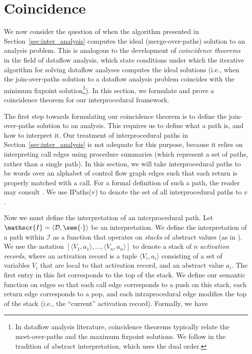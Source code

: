 \section{Coincidence}

 We now consider the question of when the algorithm presented in
 Section~\ref{sec:inter_analysis} computes the ideal (merge-over-paths)
 solution to an analysis problem.  This is analogous to the development of
 \emph{coincidence theorems} \cite{Kam1977,Sharir1981,Knoop1992b,Lal2005} in
 the field of dataflow analysis, which state conditions under which the
 iterative algorithm for solving dataflow analyses computes the ideal
 solutions (i.e., when the join-over-paths solution to a dataflow analysis
 problem coincides with the minimum fixpoint solution\footnote{In dataflow
   analysis literature, coincidence theorems typically relate the
   meet-over-paths and the maximum fixpoint solutions.  We follow in the
   tradition of abstract interpretation, which uses the dual order.}).  In this
 section, we formulate and prove a coincidence theorem for our interprocedural
 framework.

 The first step towards formulating our coincidence theorem is to define the
 join-over-paths solution to an analysis.  This requires us to define what a
 path is, and how to interpret it.  Our treatment of interprocedural paths in
 Section~\ref{sec:inter_analysis} is not adequate for this purpose, because it
 relies on interpreting call edges using procedure summaries (which represent
 a set of paths, rather than a single path).  In this section, we will take
 interprocedural paths to be words over an alphabet of control flow graph
 edges such that each return is properly matched with a call.  For a formal
 definition of such a path, the reader may consult \cite{Sharir1981}.  We use
 \textsf{IPaths(v)} to denote the set of all interprocedural paths to $v$.

 Now we must define the interpretation of an interprocedural path.  Let
 $\mathscr{I} = \langle \mathcal{D}, \sem{\cdot} \rangle$ be an
 interpretation.  We define the interpretation of a path within $\mathscr{I}$
 as a function that operates on \emph{stacks} of abstract values (as in
 \cite{Knoop1992b,Lal2005}).  We use the notation $[\langle V_1, a_1 \rangle,
   \ldots, \langle V_n, a_n \rangle]$ to denote a stack of $n$
 \emph{activation records}, where an activation record is a tuple $\langle
 V_i, a_i \rangle$ consisting of a set of variables $V_i$ that are local to
 that activation record, and an abstract value $a_i$.  The first entry in this
 list corresponds to the top of the stack.  We define our semantic function on
 edges so that each call edge corresponds to a push on this stack, each return
 edge corresponds to a pop, and each intraprocedural edge modifies the top of
 the stack (i.e., the ``current'' activation record).  Formally, we have

